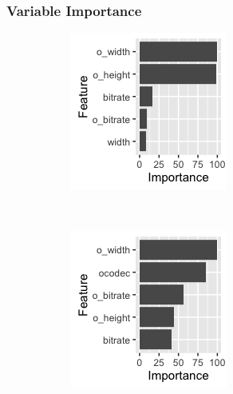 \documentclass[letterpaper,12pt,titlepage,oneside,final]{report}
\begin{document}
            \subsubsection {Variable Importance}
                \begin{figure}[!ht]
                \begin{subfigure}[t]{0.45\textwidth}
                    \centering
                    \includegraphics[width=\textwidth]{avnnetvarimp}
                    \caption{}
                    \label{avnnetvarimp}
                \end{subfigure}%
                    ~ 
                \begin{subfigure}[t]{0.45\textwidth}
                    \centering
                    \includegraphics[width=\textwidth]{marsvarimp}

\end{subfigure}
\end{figure}
\end{document}
